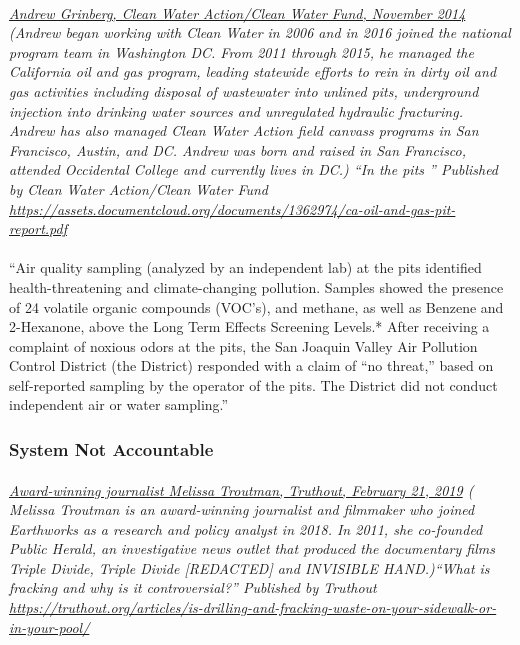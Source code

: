 \documentclass{article}
\begin{document}
\paragraph{}
\small
\textit{  
\underline{Andrew Grinberg, Clean Water Action/Clean Water Fund, November 2014}
  (Andrew began working with Clean Water in 2006 and in 2016 joined the national program team in Washington DC. From 2011 through 2015, he managed the California oil and gas program, leading statewide efforts to rein in dirty oil and gas activities including disposal of wastewater into unlined pits, underground injection into drinking water sources and unregulated hydraulic fracturing. Andrew has also managed Clean Water Action field canvass programs in San Francisco, Austin, and DC. Andrew was born and raised in San Francisco, attended Occidental College and currently lives in DC.) “In the pits ” Published by Clean Water Action/Clean Water Fund 
\url{https://assets.documentcloud.org/documents/1362974/ca-oil-and-gas-pit-report.pdf} }
\normalsize
\paragraph{}
``Air quality sampling (analyzed by an independent lab) at the pits identified health-threatening and climate-changing pollution. Samples showed the presence of 24 volatile organic compounds (VOC’s), and methane, as well as Benzene and 2-Hexanone, above the Long Term Effects Screening Levels.* After receiving a complaint of noxious odors at the pits, the San Joaquin Valley Air Pollution Control District (the District) responded with a claim of “no threat,” based on self-reported sampling by the operator of the pits. The District did not conduct independent air or water sampling.''

\subsubsection{System Not Accountable}
\paragraph{}
\small
\textit{
\underline{Award-winning journalist Melissa Troutman, Truthout, February 21, 2019}
( Melissa Troutman is an award-winning journalist and filmmaker who joined Earthworks as a research and policy analyst in 2018. In 2011, she co-founded Public Herald, an investigative news outlet that produced the documentary films Triple Divide, Triple Divide [REDACTED] and INVISIBLE HAND.)``What is fracking and why is it controversial?'' Published by Truthout
\url{https://truthout.org/articles/is-drilling-and-fracking-waste-on-your-sidewalk-or-in-your-pool/}}
\normalsize
\end{document}
